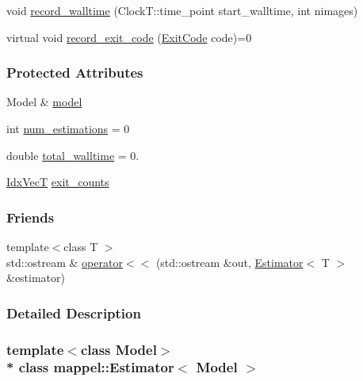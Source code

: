 \begin{DoxyCompactItemize}
\item 
void \hyperlink{classmappel_1_1Estimator_a50125572d3b87ebcf1ffb27a8d8c643d}{record\+\_\+walltime} (Clock\+T\+::time\+\_\+point start\+\_\+walltime, int nimages)
\item 
virtual void \hyperlink{classmappel_1_1Estimator_abfde3944bbb9d4af107fbafb543f2376}{record\+\_\+exit\+\_\+code} (\hyperlink{classmappel_1_1Estimator_a6d599915907ba4d0607fcb958d231edc}{Exit\+Code} code)=0
\end{DoxyCompactItemize}
\subsubsection*{Protected Attributes}
\begin{DoxyCompactItemize}
\item 
Model \& \hyperlink{classmappel_1_1Estimator_a8322546d87ccdf01f8b0dcd9dae509f0}{model}
\item 
int \hyperlink{classmappel_1_1Estimator_ab15b88435d6c50a68fac84465d950b12}{num\+\_\+estimations} = 0
\item 
double \hyperlink{classmappel_1_1Estimator_a5a408458a111c5222193871fa6bb6644}{total\+\_\+walltime} = 0.
\item 
\hyperlink{namespacemappel_ac63743dcd42180127307cd0e4ecdd784}{Idx\+VecT} \hyperlink{classmappel_1_1Estimator_a490b648fdbd7ddae7ce41fbf26e29b48}{exit\+\_\+counts}
\end{DoxyCompactItemize}
\subsubsection*{Friends}
\begin{DoxyCompactItemize}
\item 
{\footnotesize template$<$class T $>$ }\\std\+::ostream \& \hyperlink{classmappel_1_1Estimator_a362f3d091ead8a826fb320dfa61e5389}{operator$<$$<$} (std\+::ostream \&out, \hyperlink{classmappel_1_1Estimator}{Estimator}$<$ T $>$ \&estimator)
\end{DoxyCompactItemize}


\subsubsection{Detailed Description}
\subsubsection*{template$<$class Model$>$\\*
class mappel\+::\+Estimator$<$ Model $>$}




